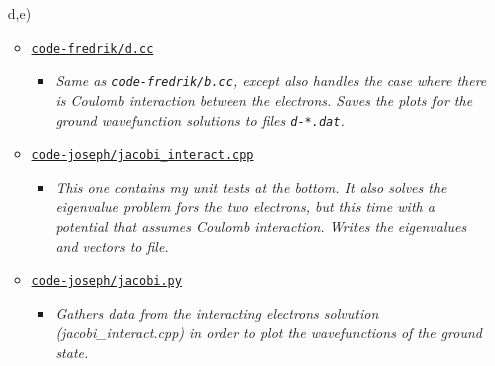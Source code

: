 \documentclass[11pt,a4paper]{article}
\begin{document}
\begin{enumerate}
  \item[d,e)]
  \begin{itemize}
    \item \href{https://github.com/frxstrem/fys3150/tree/master/project2/code-fredrik/d.cc}{\tt code-fredrik/d.cc}
    \begin{itemize}
      \item {\it Same as \texttt{code-fredrik/b.cc}, except also handles the case where there is Coulomb interaction between the electrons. Saves the plots for the ground wavefunction solutions to files \texttt{d-*.dat}.}
    \end{itemize}
    \item \href{https://github.com/frxstrem/fys3150/tree/master/project2/code-joseph/jacobi_interact.cpp}{\tt code-joseph/jacobi\_interact.cpp}
    \begin{itemize}
      \item {\it This one contains my unit tests at the bottom. It also solves the eigenvalue problem fors the two electrons, but this time with a potential that assumes Coulomb interaction. Writes the eigenvalues and vectors to file.}
    \end{itemize}
    \item \href{https://github.com/frxstrem/fys3150/tree/master/project2/code-joseph/jacobi.py}{\tt code-joseph/jacobi.py}
    \begin{itemize}
      \item {\it Gathers data from the interacting electrons solvution (jacobi_interact.cpp) in order to plot the wavefunctions of the ground state.}
    \end{itemize}
  \end{itemize}
\end{enumerate}

\clearpage

\printbibliography[heading=bibnumbered,title=Bibliography]
\end{document}
